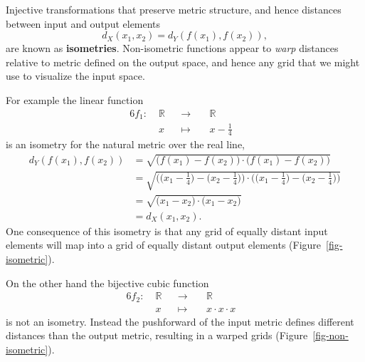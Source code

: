 \documentclass[
  letterpaper,
  DIV=11,
  numbers=noendperiod]{scrartcl}
\begin{document}
Injective transformations that preserve metric structure, and hence
distances between input and output elements \[
d_X(x_1, x_2) = d_Y(f(x_1), f(x_2)),
\] are known as \textbf{isometries}. Non-isometric functions appear to
\emph{warp} distances relative to metric defined on the output space,
and hence any grid that we might use to visualize the input space.

For example the linear function \begin{alignat*}{6}
f_1 :\; & \mathbb{R} & &\rightarrow& \; & \mathbb{R} &
\\
& x & &\mapsto& & x - \frac{1}{4} &
\end{alignat*} is an isometry for the natural metric over the real line,
\begin{align*}
d_{Y}(f(x_1), f(x_2))
&=
\sqrt{ \big( f(x_{1}) - f(x_{2}) \big) \cdot \big( f(x_{1}) - f(x_{2}) \big) }
\\
&=
\sqrt{       \big( \big( x_{1} - \frac{1}{4} \big) - \big( x_{2} - \frac{1}{4} \big) \big)
       \cdot \big( \big( x_{1} - \frac{1}{4} \big) - \big( x_{2} - \frac{1}{4} \big) \big) }
\\
&=
\sqrt{ \big( x_{1} - x_{2} \big) \cdot \big( x_{1} - x_{2} \big) }
\\
&=
d_{X}(x_1, x_2).
\end{align*} One consequence of this isometry is that any grid of
equally distant input elements will map into a grid of equally distant
output elements (Figure~\ref{fig-isometric}).

On the other hand the bijective cubic function \begin{alignat*}{6}
f_2 :\; & \mathbb{R} & &\rightarrow& \; & \mathbb{R} &
\\
& x & &\mapsto& & x \cdot x \cdot x &
\end{alignat*} is not an isometry. Instead the pushforward of the input
metric defines different distances than the output metric, resulting in
a warped grids (Figure~\ref{fig-non-isometric}).
\end{document}
